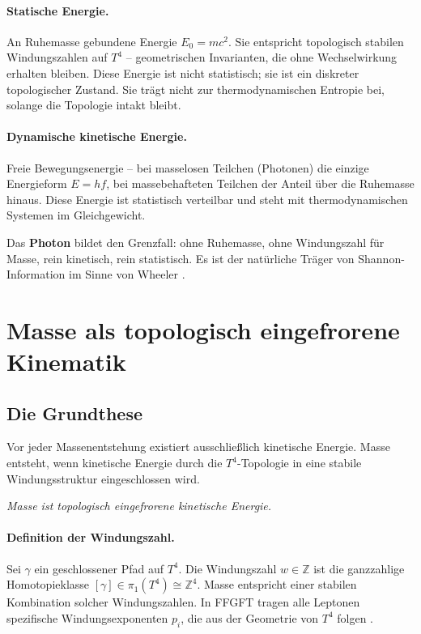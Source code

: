 \paragraph{Statische Energie.}
An Ruhemasse gebundene Energie \(E_0 = mc^2\).
Sie entspricht topologisch stabilen Windungszahlen auf \(T^4\) --
geometrischen Invarianten, die ohne Wechselwirkung erhalten bleiben.
Diese Energie ist nicht statistisch; sie ist ein diskreter topologischer
Zustand. Sie trägt nicht zur thermodynamischen Entropie bei,
solange die Topologie intakt bleibt.

\paragraph{Dynamische kinetische Energie.}
Freie Bewegungsenergie -- bei masselosen Teilchen (Photonen) die
einzige Energieform \(E = hf\), bei massebehafteten Teilchen
der Anteil über die Ruhemasse hinaus.
Diese Energie ist statistisch verteilbar und steht mit
thermodynamischen Systemen im Gleichgewicht.

Das \textbf{Photon} bildet den Grenzfall:
ohne Ruhemasse, ohne Windungszahl für Masse,
rein kinetisch, rein statistisch.
Es ist der natürliche Träger von Shannon-Information
im Sinne von Wheeler \cite{Wheeler1990}.

\section{Masse als topologisch eingefrorene Kinematik}

\subsection{Die Grundthese}

Vor jeder Massenentstehung existiert ausschließlich kinetische Energie.
Masse entsteht, wenn kinetische Energie durch die \(T^4\)-Topologie
in eine stabile Windungsstruktur eingeschlossen wird.

\begin{center}
\emph{Masse ist topologisch eingefrorene kinetische Energie.}
\end{center}

\paragraph{Definition der Windungszahl.}
Sei \(\gamma\) ein geschlossener Pfad auf \(T^4\).
Die Windungszahl \(w \in \mathbb{Z}\) ist die ganzzahlige
Homotopieklasse \([\gamma] \in \pi_1(T^4) \cong \mathbb{Z}^4\).
Masse entspricht einer stabilen Kombination solcher Windungszahlen.
In FFGFT tragen alle Leptonen spezifische Windungsexponenten \(p_i\),
die aus der Geometrie von \(T^4\) folgen \cite{Pascher2026}.

